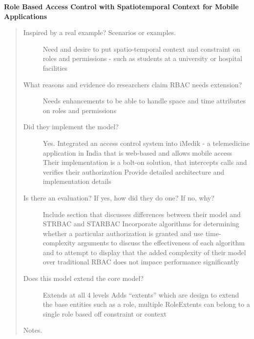 \documentclass[letterpaper,10pt,english]{sphinxmanual}
\begin{document}
\textbf{Role Based Access Control with Spatiotemporal Context for Mobile Applications}
\begin{quote}
\begin{description}
\item[{Inspired by a real example? Scenarios or examples.}] \leavevmode
Need and desire to put spatio-temporal context and constraint on roles and permissions - such as students at a university or hospital facilities

\item[{What reasons and evidence do researchers claim RBAC needs extension?}] \leavevmode
Needs enhancements to be able to handle space and time attributes on roles and permissions

\item[{Did they implement the model?}] \leavevmode
Yes.  Integrated an access control system into iMedik - a telemedicine application in India that is web-based and allows mobile access
Their implementation is a bolt-on solution, that intercepts calls and verifies their authorization
Provide detailed architecture and implementation details

\item[{Is there an evaluation? If yes, how did they do one? If no, why?}] \leavevmode
Include section that discusses differences between their model and STRBAC and STARBAC
Incorporate algorithms for determining whether a particular authorization is granted and use time-complexity arguments to discuss the effectiveness of each algorithm and to attempt to display that the added complexity of their model over traditional RBAC does not impace performance significantly

\item[{Does this model extend the core model?}] \leavevmode
Extends at all 4 levels
Adds ``extents'' which are design to extend the base entities such as a role, multiple RoleExtents can belong to a single role based off constraint or context

\end{description}

Notes.
\end{quote}
\end{document}
